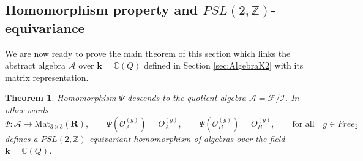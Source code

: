 \documentclass{amsart}
\newtheorem{theorem}{Theorem}
\begin{document}
\subsection{Homomorphism property and $PSL(2,\mathbb Z)$-equivariance}

We are now ready to prove the main theorem of this section which links the abstract algebra $\mathcal A$ over $\mathbf k=\mathbb C(Q)$ defined in Section \ref{sec:AlgebraK2} with its matrix representation.

\begin{theorem}
Homomorphism $\Psi$ descends to the quotient algebra $\mathcal A=\mathcal F/\mathcal I$. In other words
\begin{equation*}
\Psi:\mathcal A\rightarrow\mathrm{Mat}_{3\times 3}(\mathbf R),\qquad \Psi(\mathcal O_A^{(g)})=O_A^{(g)},\qquad \Psi(\mathcal O_B^{(g)})=O_B^{(g)},\qquad \textrm{for all}\quad g\in Free_2
\end{equation*}
defines a $PSL(2,\mathbb Z)$-equivariant homomorphism of algebras over the field $\mathbf k=\mathbb C(Q)$.
\label{th:HomomorphismToMatrixRepresentation}
\end{theorem}
\end{document}
